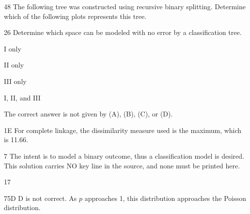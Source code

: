 \begin{question}{48}
The following tree was constructed using recursive binary splitting.
Determine which of the following plots represents this tree.
\begin{choices}
\item {}
\item {}
\item {}
\item {}
\item {}
\end{choices}
\end{question}

\begin{question}{26}
Determine which space can be modeled with no error by a classification tree.
\begin{statements}
\item {}
\item {}
\item {}
\end{statements}
\begin{choices}
\item I only
\item II only
\item III only
\item I, II, and III
\item The correct answer is not given by (A), (B), (C), or (D).
\end{choices}
\end{question}


\begin{solution}{1}{E}
For complete linkage, the dissimilarity measure used is the maximum, which is 11.66.
\end{solution}

\begin{solution}{7}{}
The intent is to model a binary outcome, thus a classification model is desired.
This solution carries NO key line in the source, and none must be printed here.
\end{solution}

\begin{solution}{17}{}
\deleted
\end{solution}

\begin{solution}{75}{D}
D is not correct. As $p$ approaches 1, this distribution approaches the Poisson
distribution.
\end{solution}


